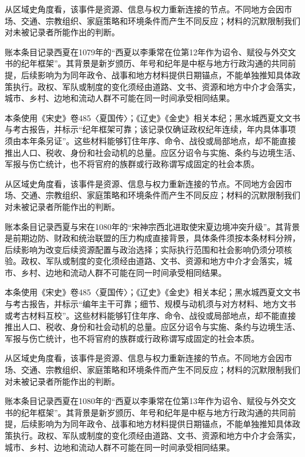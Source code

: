 从区域史角度看，该事件是资源、信息与权力重新连接的节点。不同地方会因市场、交通、宗教组织、家庭策略和环境条件而产生不同反应；材料的沉默限制我们对未被记录者所能作出的判断。

账本条目记录西夏在1079年的“西夏以李秉常在位第12年作为诏令、赋役与外交文书的纪年框架”。其背景是新岁颁历、年号和纪年是中枢与地方行政沟通的共同前提，后续影响为为同年政令、战事和地方材料提供日期锚点，不能单独推知具体政策执行。政权、军队或制度的变化须经由道路、文书、资源和地方中介才会落实，城市、乡村、边地和流动人群不可能在同一时间承受相同结果。

本条使用《宋史》卷485〈夏国传〉；《辽史》《金史》相关本纪；黑水城西夏文文书与考古报告，并标示“纪年框架可靠；该记录仅确证政权纪年连续，年内具体事项须由本年条另证”。这些材料能够钉住年序、命令、战役或局部地点，却不能直接推出人口、税收、身份和社会动机的总量。应区分诏令与实施、条约与边境生活、军报与伤亡统计，也不将官府的族群或行政称谓写成固定的社会本质。

从区域史角度看，该事件是资源、信息与权力重新连接的节点。不同地方会因市场、交通、宗教组织、家庭策略和环境条件而产生不同反应；材料的沉默限制我们对未被记录者所能作出的判断。

账本条目记录西夏与宋在1080年的“宋神宗西北进取使宋夏边境冲突升级”。其背景是前期边防、财政和统治联盟的压力构成直接背景，具体条件须按本条材料分辨，后续影响为改变后续资源配置与政治选择；实际执行范围和社会影响仍须分项核验。政权、军队或制度的变化须经由道路、文书、资源和地方中介才会落实，城市、乡村、边地和流动人群不可能在同一时间承受相同结果。

本条使用《宋史》卷485〈夏国传〉；《辽史》《金史》相关本纪；黑水城西夏文文书与考古报告，并标示“编年主干可靠；细节、规模与动机须与对方材料、地方文书或考古材料互校”。这些材料能够钉住年序、命令、战役或局部地点，却不能直接推出人口、税收、身份和社会动机的总量。应区分诏令与实施、条约与边境生活、军报与伤亡统计，也不将官府的族群或行政称谓写成固定的社会本质。

从区域史角度看，该事件是资源、信息与权力重新连接的节点。不同地方会因市场、交通、宗教组织、家庭策略和环境条件而产生不同反应；材料的沉默限制我们对未被记录者所能作出的判断。

账本条目记录西夏在1080年的“西夏以李秉常在位第13年作为诏令、赋役与外交文书的纪年框架”。其背景是新岁颁历、年号和纪年是中枢与地方行政沟通的共同前提，后续影响为为同年政令、战事和地方材料提供日期锚点，不能单独推知具体政策执行。政权、军队或制度的变化须经由道路、文书、资源和地方中介才会落实，城市、乡村、边地和流动人群不可能在同一时间承受相同结果。

